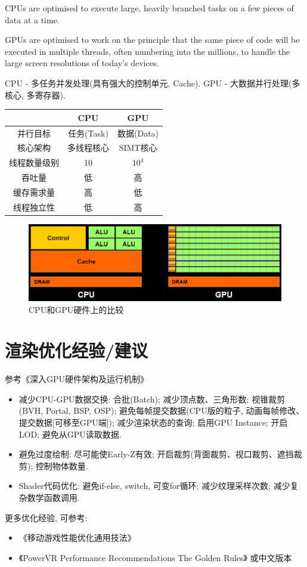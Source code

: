 \documentclass[UTF8]{ctexart}
\begin{document}
CPUs are optimised to execute large, heavily branched tasks on a few pieces of
data at a time. \cite{powerVR_int}

GPUs are optimised to work on the principle that the same piece of code will be
executed in multiple threads, often numbering into the millions, to handle the large
screen resolutions of today’s devices. \cite{powerVR_int}

CPU - 多任务并发处理(具有强大的控制单元, Cache). GPU - 大数据并行处理(多核心, 多寄存器).
\begin{center}
  \begin{tabular}{| c  c  c |}
    \hline
     & \textbf{CPU} & \textbf{GPU} \\ [0.8ex] 
    \hline
    并行目标 & 任务(Task) & 数据(Data)\\
    \hline
    核心架构 & 多线程核心 & SIMT核心\\
    \hline
    线程数量级别 & 10 & $10^4$\\
    \hline
    吞吐量 & 低 & 高\\
    \hline
    缓存需求量 & 高 & 低\\
    \hline
    线程独立性 & 低 & 高\\
    \hline
  \end{tabular}
\end{center}

\begin{figure}[H]
  \includegraphics[width=15cm]{gpu_vs_cpu.png}
  \centering
  \caption{CPU和GPU硬件上的比较}
  \label{fig:CPU_VS_GPU}
\end{figure}

\section{渲染优化经验/建议}
参考《深入GPU硬件架构及运行机制》\cite{deepIntoGPU}
\begin{itemize}
\item 减少CPU-GPU数据交换: 合批(Batch); 减少顶点数、三角形数; 视锥裁剪(BVH, Portal, BSP, OSP); 避免每帧提交数据(CPU版的粒子, 动画每帧修改、提交数据[可移至GPU端]); 减少渲染状态的查询; 启用GPU Instance; 开启LOD; 避免从GPU读取数据.
\item 避免过度绘制: 尽可能使Early-Z有效; 开启裁剪(背面裁剪、视口裁剪、遮挡裁剪); 控制物体数量.
\item Shader代码优化: 避免if-else, switch, 可变for循环; 减少纹理采样次数; 减少复杂数学函数调用.
\end{itemize}

更多优化经验, 可参考:
\begin{itemize}
\item 《移动游戏性能优化通用技法》\cite{renderingOpt}
\item 《PowerVR Performance Recommendations The Golden Rules》\cite{powerVR_int} 或中文版本\cite{powerVR_opt_ch}
\end{itemize}

\end{document}
